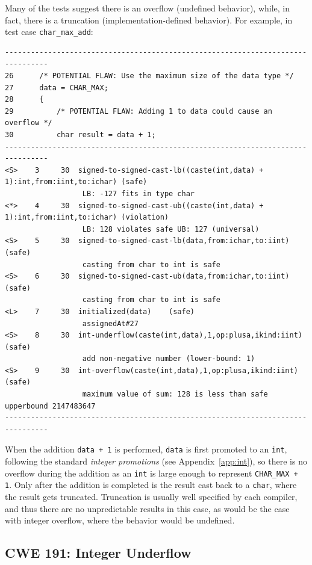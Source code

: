 \documentclass[11pt]{article}
\begin{document}
Many of the tests suggest there is an overflow (undefined behavior), while, in fact, there
is a truncation  (implementation-defined behavior). For example, in test case {\tt char\_max\_add}:
\begin{tiny}
\begin{verbatim}
--------------------------------------------------------------------------------
26      /* POTENTIAL FLAW: Use the maximum size of the data type */
27      data = CHAR_MAX;
28      {
29          /* POTENTIAL FLAW: Adding 1 to data could cause an overflow */
30          char result = data + 1;
--------------------------------------------------------------------------------
<S>    3     30  signed-to-signed-cast-lb((caste(int,data) + 1):int,from:iint,to:ichar) (safe)
                  LB: -127 fits in type char
<*>    4     30  signed-to-signed-cast-ub((caste(int,data) + 1):int,from:iint,to:ichar) (violation)
                  LB: 128 violates safe UB: 127 (universal)
<S>    5     30  signed-to-signed-cast-lb(data,from:ichar,to:iint) (safe)
                  casting from char to int is safe
<S>    6     30  signed-to-signed-cast-ub(data,from:ichar,to:iint) (safe)
                  casting from char to int is safe
<L>    7     30  initialized(data)    (safe)
                  assignedAt#27
<S>    8     30  int-underflow(caste(int,data),1,op:plusa,ikind:iint) (safe)
                  add non-negative number (lower-bound: 1)
<S>    9     30  int-overflow(caste(int,data),1,op:plusa,ikind:iint) (safe)
                  maximum value of sum: 128 is less than safe upperbound 2147483647
--------------------------------------------------------------------------------
\end{verbatim}
\end{tiny}
When the addition {\tt data + 1} is performed, {\tt data} is first promoted to an {\tt int},
following the standard \emph{integer promotions} (see Appendix~\ref{app:int}), so there is
no overflow during the addition as an {\tt int} is large enough to represent {\tt CHAR\_MAX + 1}.
Only after the addition is completed is the result cast back to a {\tt char}, where the result
gets truncated. Truncation is usually well specified by each compiler, and thus there are no
unpredictable results in this case, as would be the case with integer overflow, where the
behavior would be undefined.

\subsection{CWE 191: Integer Underflow}
\end{document}
